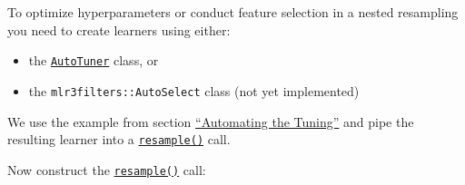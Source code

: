 \documentclass[]{article}
\newenvironment{Shaded}{}{}
\newcommand{\DataTypeTok}[1]{#1}
\newcommand{\DecValTok}[1]{#1}
\newcommand{\FloatTok}[1]{#1}
\newcommand{\KeywordTok}[1]{\textcolor[rgb]{0.00,0.00,1.00}{#1}}
\newcommand{\NormalTok}[1]{#1}
\newcommand{\OperatorTok}[1]{#1}
\newcommand{\StringTok}[1]{\textcolor[rgb]{0.00,0.50,0.50}{#1}}
\providecommand{\tightlist}{%
  \setlength{\itemsep}{0pt}\setlength{\parskip}{0pt}}
\renewenvironment{Shaded} {\begin{snugshade}\small} {\end{snugshade}}
\begin{document}
To optimize hyperparameters or conduct feature selection in a nested resampling you need to create learners using either:

\begin{itemize}
\tightlist
\item
  the \href{https://mlr3tuning.mlr-org.com/reference/AutoTuner.html}{\texttt{AutoTuner}} class, or
\item
  the \texttt{mlr3filters::AutoSelect} class (not yet implemented)
\end{itemize}

We use the example from section \protect\hyperlink{autotuner}{``Automating the Tuning''} and pipe the resulting learner into a \href{https://mlr3.mlr-org.com/reference/resample.html}{\texttt{resample()}} call.

\begin{Shaded}
\end{Shaded}

Now construct the \href{https://mlr3.mlr-org.com/reference/resample.html}{\texttt{resample()}} call:
\end{document}
